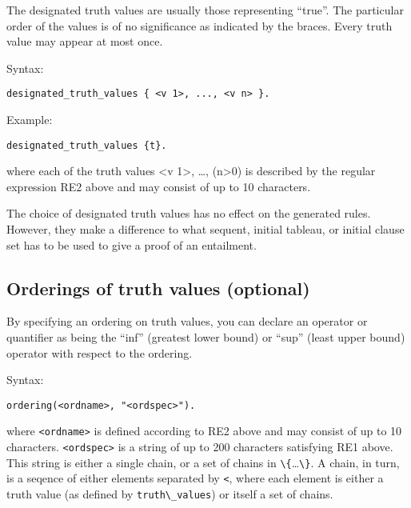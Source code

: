 \documentclass[
]{article}
\newcommand{\passthrough}[1]{#1}
\begin{document}
The designated truth values are usually those representing ``true''. The
particular order of the values is of no significance as indicated by the
braces. Every truth value may appear at most once.

Syntax:

\begin{lstlisting}
designated_truth_values { <v 1>, ..., <v n> }.
\end{lstlisting}

Example:

\begin{lstlisting}
designated_truth_values {t}.
\end{lstlisting}

where each of the truth values \textless v 1\textgreater, \ldots,
(n\textgreater0) is described by the regular expression RE2 above and
may consist of up to 10 characters.

The choice of designated truth values has no effect on the generated
rules. However, they make a difference to what sequent, initial tableau,
or initial clause set has to be used to give a proof of an entailment.

\hypertarget{orderings-of-truth-values-optional}{%
\subsection{Orderings of truth values
(optional)}\label{orderings-of-truth-values-optional}}

By specifying an ordering on truth values, you can declare an operator
or quantifier as being the ``inf'' (greatest lower bound) or ``sup''
(least upper bound) operator with respect to the ordering.

Syntax:

\begin{lstlisting}
ordering(<ordname>, "<ordspec>").
\end{lstlisting}

where \passthrough{\lstinline!<ordname>!} is defined according to RE2
above and may consist of up to 10 characters.
\passthrough{\lstinline!<ordspec>!} is a string of up to 200 characters
satisfying RE1 above. This string is either a single chain, or a set of
chains in
\passthrough{\lstinline!\{!}\ldots{}\passthrough{\lstinline!\}!}. A
chain, in turn, is a seqence of either elements separated by
\passthrough{\lstinline!<!}, where each element is either a truth value
(as defined by \passthrough{\lstinline!truth\_values!}) or itself a set
of chains.
\end{document}

